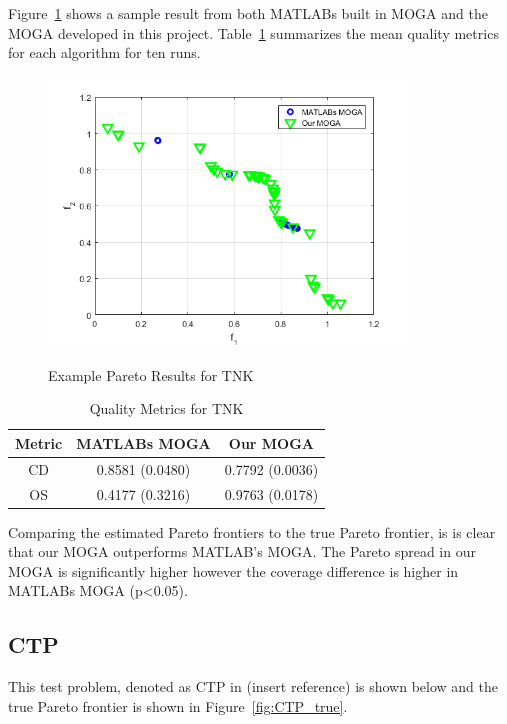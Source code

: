 \documentclass{article}
\begin{document}
Figure~\ref{fig:TNK} shows a sample result from both MATLABs built in MOGA and the MOGA developed in this project. Table~\ref{tab:TNK} summarizes the mean quality metrics for each algorithm for ten runs.
\begin{figure}[h]
  \caption{Example Pareto Results for TNK}
  \centering
  \includegraphics[width=0.85\textwidth]{TNK_pareto_final.png}  
  \label{fig:TNK}
\end{figure}

\begin{table}[h]
\caption{Quality Metrics for TNK} 
\centering 
\begin{tabular}{|c|c|c|} 
\hline\hline  
Metric & MATLABs MOGA & Our MOGA \\ \hline
CD &  0.8581 (0.0480) & 0.7792 (0.0036) \\ \hline
OS & 0.4177 (0.3216) & 0.9763 (0.0178)\\ \hline
\end{tabular}
\label{tab:TNK} 
\end{table}
 
Comparing the estimated Pareto frontiers to the true Pareto frontier, is is clear that our MOGA outperforms MATLAB's MOGA. The Pareto spread in our MOGA is significantly higher however the coverage difference is higher in MATLABs MOGA (p<0.05).

\subsection{CTP} 
This test problem, denoted as CTP in (insert reference) is shown below and the true Pareto frontier is shown in Figure~\ref{fig:CTP_true}. 
\end{document}
